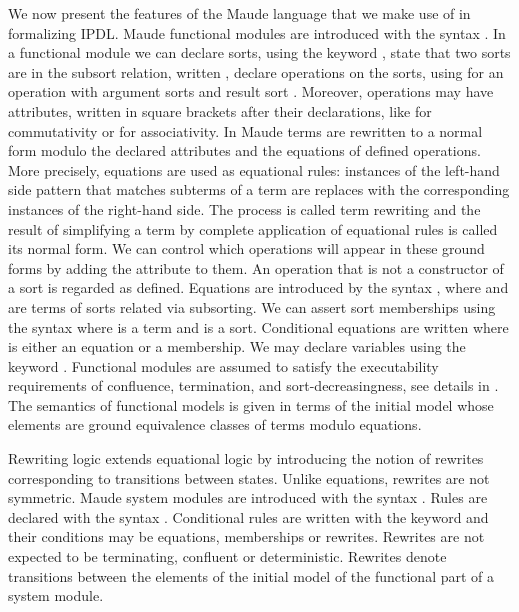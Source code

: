We now present the features of the Maude language that we make use of
in formalizing IPDL.
Maude functional modules are introduced with the syntax
. In a functional module we can declare
sorts, using the keyword , state that two sorts are
in the subsort relation, written , declare
operations on the sorts, using  for 
an operation  with argument sorts  and 
result sort . Moreover, operations
may have attributes, written in square brackets after their declarations,
like  for commutativity or  for associativity.
In Maude terms are rewritten to a normal form modulo the declared 
attributes and the equations of defined operations.
More precisely, 
equations are used as equational rules: instances of the left-hand side
pattern that matches subterms of a term are replaces with the 
corresponding instances of the right-hand side.
The process is called term rewriting and the result of simplifying a term by complete application of equational rules is called its normal form. 
We can control which operations will appear in these ground
forms by adding the attribute  to them. An operation that
is not a constructor of a sort is regarded as defined. 
Equations are introduced by the syntax 
, where  and  are terms
of sorts related via subsorting. 
We can assert sort memberships using the syntax 
where  is a term and  is a sort.
Conditional equations are written
where  is either an equation or a membership.
We may declare variables using the keyword .
Functional modules are assumed to satisfy the executability requirements of confluence,
termination, and sort-decreasingness, see details
in \cite{DBLP:conf/maude/2007}.
The semantics of functional models is given in terms of the initial
model whose elements are ground equivalence classes of terms modulo
equations.

Rewriting logic extends equational logic by introducing the notion of rewrites corresponding to transitions between states.
Unlike equations, rewrites are not symmetric. Maude system modules
are introduced with the syntax . Rules
are declared with the syntax 
. 
Conditional rules are written with the keyword
and their conditions
 may be equations, memberships or rewrites. 
Rewrites are not expected to be terminating, confluent or deterministic.
Rewrites denote transitions between the elements of the initial model
of the functional part of a system module.

